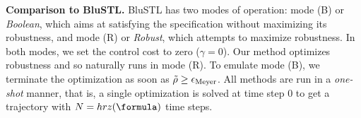 \textbf{Comparison to BluSTL.}
BluSTL has two modes of operation: mode (B) or \textit{Boolean}, which aims at satisfying the specification without maximizing its robustness, and mode (R) or \textit{Robust}, which attempts to maximize robustness. 
In both modes, we set the control cost to zero ($\gamma=0$). 
Our method optimizes robustness and so naturally runs in mode (R).
To emulate mode (B), we terminate the optimization as soon as $\tilde{\rho} \geq \epsilon_{\text{Meyer}}$.
All methods are run in a \textit{one-shot} manner, that is, a single optimization is solved at time step $0$ to get a trajectory with $N = hrz(\formula)$ time steps.



%
